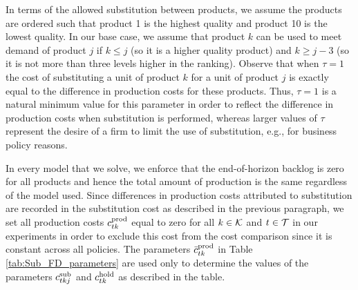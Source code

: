 \documentclass[msom]{oo}
\begin{document}
In terms of the allowed substitution between products, we assume the products are ordered such that product 1 is the highest quality and product 10 is the lowest quality. In our base case, we assume that product $k$ can be used to meet demand of product $j$ if $k \leq j$ (so it is a higher quality product) and $k \geq j-3$ (so it is not more than three levels higher in the ranking).
Observe that when $\tau=1$ the cost of substituting a unit of product $k$ for a unit of product $j$ is exactly equal to the difference in production costs for these products. Thus, $\tau=1$ is a natural minimum value for this parameter in order to reflect the difference in production costs when substitution is performed, whereas larger values of $\tau$ represent the desire of a firm to limit the use of substitution, e.g., for business policy reasons. 

In every model that we solve, we enforce that the end-of-horizon backlog is zero for all products and hence the total amount of production is the same regardless of the model used. Since differences in production costs attributed to substitution are recorded in the substitution cost as described in the previous paragraph, we set all production costs $c^{\text{prod}}_{t k}$ equal to zero for all $k \in \mathcal{K}$ and $t \in \mathcal{T}$  in our experiments in order to exclude this cost from the cost comparison since it is constant across all policies. The parameters $\bar{c}^{\text{prod}}_{t k}$ in Table
 \ref{tab:Sub_FD_parameters} are used only to determine the values of the parameters $c^{\text{sub}}_{t k j }$ and $c^{\text{hold}}_{t k}$  as described in the table.


\end{document}
